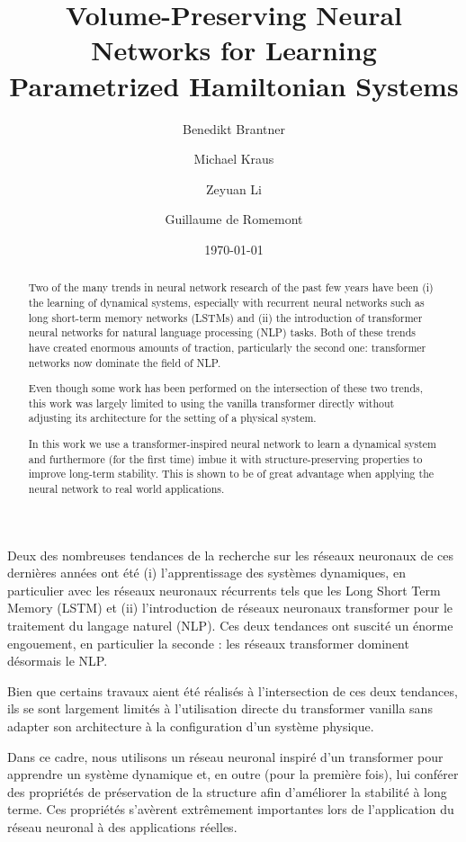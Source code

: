 \documentclass[proc]{edpsmath}
\begin{document}
\title{Volume-Preserving Neural Networks for Learning Parametrized Hamiltonian Systems}%
%
\author{Benedikt Brantner}\address{Max-Planck-Institut f\"ur Plasmaphysik, Boltzmannstra\ss{}e 2, 85748 Garching}
\author{Michael Kraus} %
\author{Zeyuan Li}\address{Zentrum Mathematik, Technische Universität München, Boltzmannstra\ss{}e 3, 85748 Garching, Germany}
\author{Guillaume de Romemont} \address{DAAA, ONERA, Université Paris Saclay, F-92322, Châtillon, France}
%
\date{\today}

\begin{abstract} 
    Two of the many trends in neural network research of the past few years have been (i) the learning of dynamical systems, especially with recurrent neural networks such as long short-term memory networks (LSTMs) and (ii) the introduction of transformer neural networks for natural language processing (NLP) tasks. Both of these trends have created enormous amounts of traction, particularly the second one: transformer networks now dominate the field of NLP. 

    Even though some work has been performed on the intersection of these two trends, this work was largely limited to using the vanilla transformer directly without adjusting its architecture for the setting of a physical system.

    In this work we use a transformer-inspired neural network to learn a dynamical system and furthermore (for the first time) imbue it with structure-preserving properties to improve long-term stability. This is shown to be of great advantage when applying the neural network to real world applications.
\end{abstract}
%
\begin{resume} 
    Deux des nombreuses tendances de la recherche sur les réseaux neuronaux de ces dernières années ont été (i) l'apprentissage des systèmes dynamiques, en particulier avec les réseaux neuronaux récurrents tels que les Long Short Term Memory (LSTM) et (ii) l'introduction de réseaux neuronaux transformer pour le traitement du langage naturel (NLP). Ces deux tendances ont suscité un énorme engouement, en particulier la seconde : les réseaux transformer dominent désormais le NLP. 

    Bien que certains travaux aient été réalisés à l'intersection de ces deux tendances, ils se sont largement limités à l'utilisation directe du transformer vanilla sans adapter son architecture à la configuration d'un système physique.
    
    Dans ce cadre, nous utilisons un réseau neuronal inspiré d'un transformer pour apprendre un système dynamique et, en outre (pour la première fois), lui conférer des propriétés de préservation de la structure afin d'améliorer la stabilité à long terme. Ces propriétés s'avèrent extrêmement importantes lors de l'application du réseau neuronal à des applications réelles.
    
\end{resume}
\end{document}
